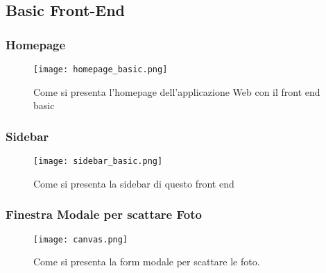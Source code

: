 \subsection{Basic Front-End}

\subsubsection{Homepage}
\begin{figure}[h]
	\centering
	\caption{Come si presenta l'homepage dell'applicazione Web con il front end basic}
	\texttt{[image: homepage\_basic.png]}
\end{figure} 
\newpage

\subsubsection{Sidebar}
\begin{figure}[h]
	\centering
	\caption{Come si presenta la sidebar di questo front end}
	\texttt{[image: sidebar\_basic.png]}
\end{figure} 
\newpage

\subsubsection{Finestra Modale per scattare Foto}
\begin{figure}[h]
	\centering
	\caption{Come si presenta la form modale per scattare le foto.}
	\texttt{[image: canvas.png]}
\end{figure} 
\newpage

